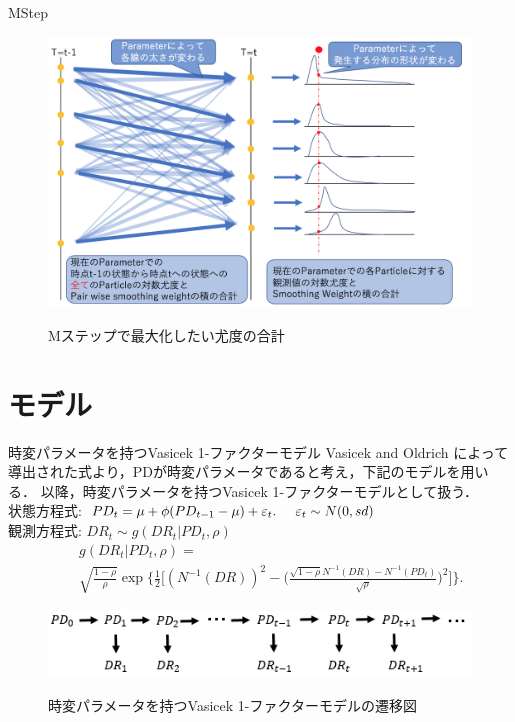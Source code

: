 \documentclass[dvipdfmx]{beamer}
\begin{document}
\begin{frame}{MStep}
\begin{figure}[h]
\begin{center}
  \includegraphics[scale=0.39]{figure/em_img.png} \\
\label{fig:Em}
\end{center}
\caption{Mステップで最大化したい尤度の合計}
\end{figure}
\end{frame}



\section{モデル}
\begin{frame}{時変パラメータを持つVasicek 1-ファクターモデル}
Vasicek and Oldrich によって導出された式より，PDが時変パラメータであると考え，下記のモデルを用いる．
以降，時変パラメータを持つVasicek 1-ファクターモデルとして扱う．\\
状態方程式:
$PD_t=\mu+\phi(PD_{t-1}-\mu)+\varepsilon_t.  \hspace{5mm} \varepsilon_t \sim N(0,sd)$\\
観測方程式:
$
DR_t\sim g(DR_t|PD_t,\rho)
$
\begin{eqnarray}
&&g(DR_t|PD_t,\rho)=\nonumber\\
&&\sqrt{\frac{1- {\rho}}{ {\rho}}} \exp\biggl\{ \frac{1}{2} \biggl[ (N^{-1}(DR))^2 - \biggl( \frac{\sqrt{1- {\rho}}N^{-1}(DR)-N^{-1}({PD_t})}{\sqrt{ {\rho}}}\biggr)^2\biggr]\biggr\}.\nonumber
\end{eqnarray}
\begin{figure}[h]
\begin{center}
  \includegraphics[scale=0.8]{figure/状態空間モデル2.png} \\
\caption{時変パラメータを持つVasicek 1-ファクターモデルの遷移図}
\label{fig:時変パラメータを持つVasicek 1-ファクターモデルの遷移図}
\end{center}
\end{figure}
\end{frame}
\end{document}

